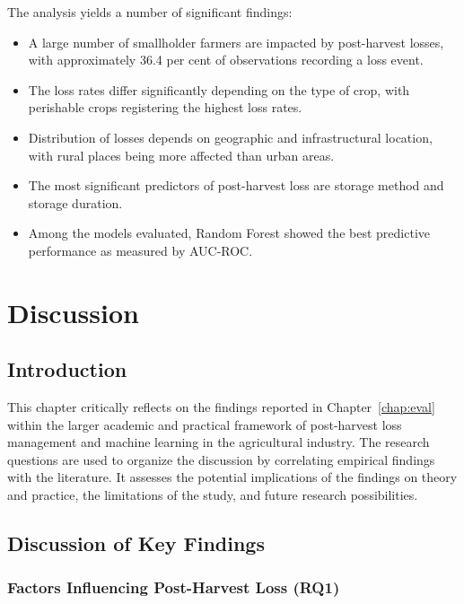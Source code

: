 The analysis yields a number of significant findings:

\begin{itemize}
    \item A large number of smallholder farmers are impacted by post-harvest losses, with
          approximately 36.4 per cent of observations recording a loss event.
    \item The loss rates differ significantly depending on the type of crop, with perishable
          crops registering the highest loss rates.
    \item Distribution of losses depends on geographic and infrastructural location, with rural
          places being more affected than urban areas.
    \item The most significant predictors of post-harvest loss are storage method and storage
          duration.
    \item Among the models evaluated, Random Forest showed the best predictive performance as
          measured by AUC-ROC.
\end{itemize}


\chapter{Discussion}
\label{chap:discuss}

\section{Introduction}

This chapter critically reflects on the findings reported in Chapter~\ref{chap:eval} within the
larger academic and practical framework of post-harvest loss management and machine learning in the
agricultural industry. The research questions are used to organize the discussion by correlating
empirical findings with the literature. It assesses the potential implications of the findings on
theory and practice, the limitations of the study, and future research possibilities.


\section{Discussion of Key Findings}

\subsection{Factors Influencing Post-Harvest Loss (RQ1)}

